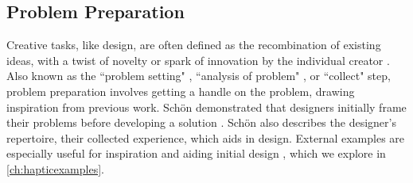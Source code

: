 \subsection{Problem Preparation}
Creative tasks, like design, are often defined as the recombination of existing ideas, with a twist of novelty or spark of innovation by the individual creator \cite{Warr2005}.
Also known as the ``problem setting" \cite{Schon1982}, ``analysis of problem" \cite{Warr2005}, or ``collect" \cite{Shneiderman2000} step, problem preparation involves getting a handle on the problem,  drawing inspiration from previous work. %
Sch\"{o}n demonstrated that designers initially frame their problems before developing a solution \cite{Schon1982}.
Sch\"{o}n also describes the designer's repertoire, their collected experience, which aids in design.
External examples are especially useful for inspiration and aiding initial design \cite{Herring2009,Buxton2007}, which we explore in \autoref{ch:hapticexamples}.


%
%

